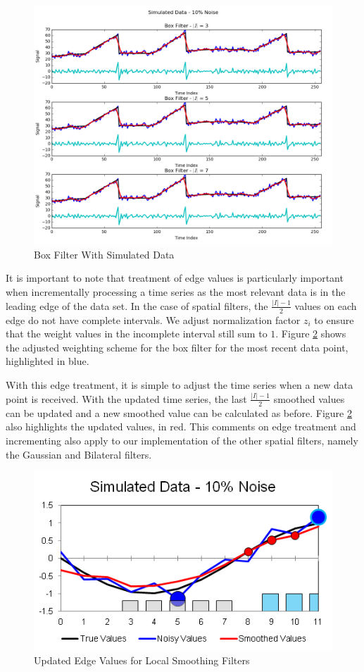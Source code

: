 \documentclass[11pt]{article}
\theoremstyle{definition}
\begin{document}
\begin{figure}
\centering
\includegraphics[width = 0.65 \textwidth]{BoxCompare.png}
\caption{Box Filter With Simulated Data}
\label{boxcompare}
\end{figure}

It is important to note that treatment of edge values is particularly important when incrementally processing a time series as the most relevant data is in the leading edge of the data set. In the case of spatial filters, the $\frac{\lvert I \rvert - 1}{2}$ values on each edge do not have complete intervals. We adjust normalization factor $z_i$ to ensure that the weight values in the incomplete interval still sum to $1$. Figure \ref{increment} shows the adjusted weighting scheme for the box filter for the most recent data point, highlighted in blue.

With this edge treatment, it is simple to adjust the time series when a new data point is received. With the updated time series, the last $\frac{\lvert I \rvert - 1}{2}$ smoothed values can be updated and a new smoothed value can be calculated as before. Figure \ref{increment} also highlights the updated values, in red. This comments on edge treatment and incrementing also apply to our implementation of the other spatial filters, namely the Gaussian and Bilateral filters.

\begin{figure}
\centering
\includegraphics[width = 0.65 \textwidth]{Increment.png}
\caption{Updated Edge Values for Local Smoothing Filters}
\label{increment}
\end{figure}
\end{document}
